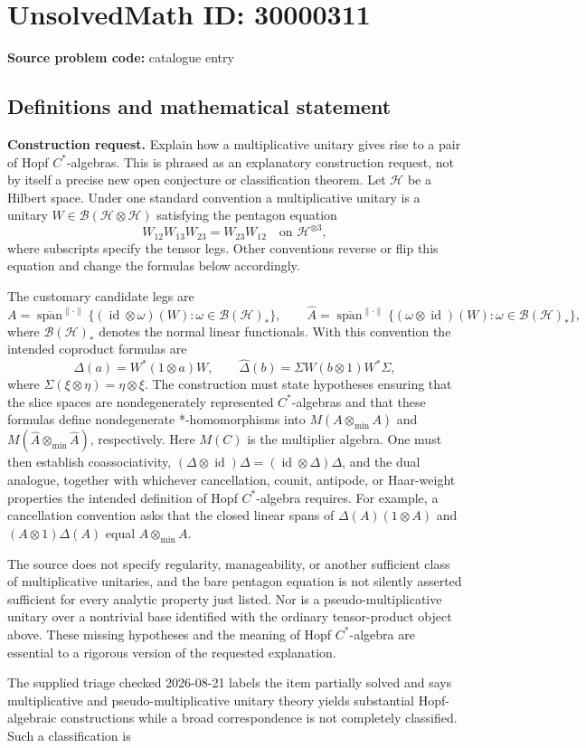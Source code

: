 \documentclass[11pt]{article}
\begin{document}
\section*{UnsolvedMath ID: 30000311}
\textbf{Source problem code:} catalogue entry
\subsection{Definitions and mathematical statement}
\textbf{Construction request.} Explain how a multiplicative unitary gives rise to a pair of Hopf \(C^*\)-algebras. This is phrased as an explanatory construction request, not by itself a precise new open conjecture or classification theorem. Let \(\mathcal H\) be a Hilbert space. Under one standard convention a multiplicative unitary is a unitary \(W\in\mathcal B(\mathcal H\otimes\mathcal H)\) satisfying the pentagon equation\[W_{12}W_{13}W_{23}=W_{23}W_{12}\quad\text{on }\mathcal H^{\otimes3},\] where subscripts specify the tensor legs. Other conventions reverse or flip this equation and change the formulas below accordingly.\par The customary candidate legs are\[A=\overline{\operatorname{span}}^{\|\cdot\|}\{(\operatorname{id}\otimes\omega)(W):\omega\in\mathcal B(\mathcal H)_*\},\qquad \widehat A=\overline{\operatorname{span}}^{\|\cdot\|}\{(\omega\otimes\operatorname{id})(W):\omega\in\mathcal B(\mathcal H)_*\},\] where \(\mathcal B(\mathcal H)_*\) denotes the normal linear functionals. With this convention the intended coproduct formulas are\[\Delta(a)=W^*(1\otimes a)W,\qquad \widehat\Delta(b)=\Sigma W(b\otimes1)W^*\Sigma,\] where \(\Sigma(\xi\otimes\eta)=\eta\otimes\xi\). The construction must state hypotheses ensuring that the slice spaces are nondegenerately represented \(C^*\)-algebras and that these formulas define nondegenerate *-homomorphisms into \(M(A\otimes_{\min}A)\) and \(M(\widehat A\otimes_{\min}\widehat A)\), respectively. Here \(M(C)\) is the multiplier algebra. One must then establish coassociativity, \((\Delta\otimes\operatorname{id})\Delta=(\operatorname{id}\otimes\Delta)\Delta\), and the dual analogue, together with whichever cancellation, counit, antipode, or Haar-weight properties the intended definition of Hopf \(C^*\)-algebra requires. For example, a cancellation convention asks that the closed linear spans of \(\Delta(A)(1\otimes A)\) and \((A\otimes1)\Delta(A)\) equal \(A\otimes_{\min}A\).\par The source does not specify regularity, manageability, or another sufficient class of multiplicative unitaries, and the bare pentagon equation is not silently asserted sufficient for every analytic property just listed. Nor is a pseudo-multiplicative unitary over a nontrivial base identified with the ordinary tensor-product object above. These missing hypotheses and the meaning of Hopf \(C^*\)-algebra are essential to a rigorous version of the requested explanation.\par The supplied triage checked 2026-08-21 labels the item partially solved and says multiplicative and pseudo-multiplicative unitary theory yields substantial Hopf-algebraic constructions while a broad correspondence is not completely classified. Such a classification is 
\end{document}
